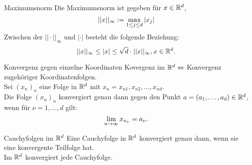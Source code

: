 \documentclass[main.tex]{subfiles}
\begin{document}
\begin{karte}{Maximumsnorm}
    Die Maximumsnorm ist gegeben für \(x\in\mathbb{R}^d\),
	\[ ||x||_\infty := \underset{1\leq j\leq d}{\max} \left| x_j \right| \]
    Zwischen der \( ||\cdot||_\infty \) und \( |\cdot| \) 
    besteht die folgende Beziehung:
    \[ ||x||_\infty \leq |x| 
    \leq \sqrt{d} \cdot ||x||_\infty, x\in\mathbb{R}^d. \]
\end{karte}
\begin{karte}{Konvergenz gegen einzelne Koordinaten}
    Kovergenz im \(\mathbb{R}^d \Leftrightarrow \) 
    Konvergenz zugehöriger Koordinatenfolgen.\\
    Sei \({(x_n)}_n\) eine Folge in \(\mathbb{R}^d\) mit 
    \(x_n = x_{n1},x_{n2},\dots,x_{nd}\).\\
    Die Folge \({(x_n)}_n\) konvergiert genau 
    dann gegen den Punkt \(a = (a_1,\dots,a_d)\in\mathbb{R}^d\), 
    wenn für \(\nu = 1,\dots,d\) gilt:
	\[ \lim\limits_{n\rightarrow\infty} x_{n_\nu} = a_\nu. \]
\end{karte}
\begin{karte}{Cauchyfolgen im \(\mathbb{R}^d\)}
    Eine Cauchyfolge in \(\mathbb{R}^d\) konvergiert genau dann, 
    wenn sie eine konvergente Teilfolge hat.\\
    Im \(\mathbb{R}^d\) konvergiert jede Cauchyfolge.
\end{karte}
\end{document}
